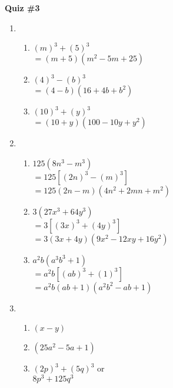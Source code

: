 \begin{center}
\textbf{Quiz \#3}
\end{center} 

\begin{enumerate}[label = \Alph*. ]

\item \phantom{a}
\begin{enumerate}[label = \arabic*. ]
\item %
\hspce $(m)^3 + (5)^3$\\
$=\left(m + 5\right) \left(m^{2} - 5 m + 25\right)$
\item %
\hspce $(4)^3 - (b)^3$\\
$=\left(4 - b\right) \left(16+ 4 b +b^{2}\right)$
\item %
\hspce $(10)^3 + (y)^3$\\
$=\left(10+ y\right) \left(100  - 10 y + y^{2}\right)$
\end{enumerate}   


\item \phantom{a}
\begin{enumerate}[label = \arabic*. ]
\item %
\hspce $125(8n^3-m^3)$\\
$=125[(2n)^3 - (m)^3]$\\
$= 125 \left(2n -  m\right) \left(4n^{2} + 2 m n + m^{2}  \right)$
\item %
\hspce $3(27x^3+64y^3)$\\
$=3[(3x)^3 + (4y)^3]$\\
$=3 \left(3 x + 4 y\right) \left(9 x^{2} - 12 x y + 16 y^{2}\right)$
\item %
\hspce $a^{2} b(a^3b^3+1)$\\
$=a^{2} b[(a b )^3 + (1)^3]$\\
$=a^{2} b \left(a b + 1\right) \left(a^{2} b^{2} - a b + 1\right)$
\end{enumerate}   

\item \phantom{a}
\begin{enumerate}[label = \arabic*. ]
\item \hspce $(x-y)$ %
\item \hspce $(25a^2-5a+1)$ %
\item \hspce  $(2p)^3+(5q)^3$ or\\
$8p^3+125q^3$

\end{enumerate}   


\end{enumerate}  